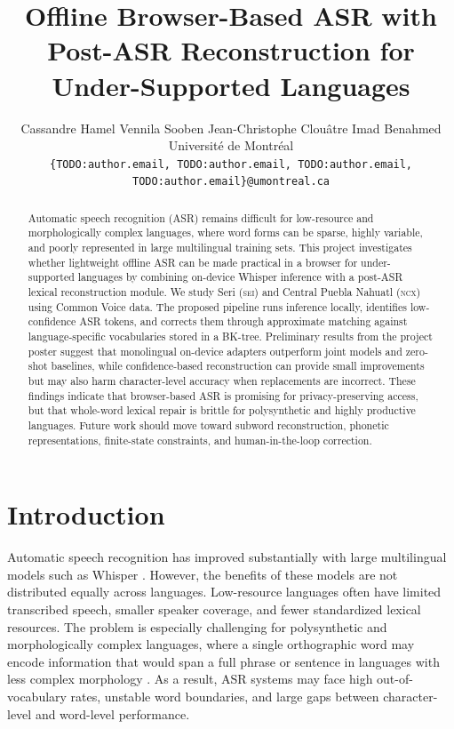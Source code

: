 \documentclass[11pt]{article}
\title{Offline Browser-Based ASR with Post-ASR Reconstruction for Under-Supported Languages}
\author{Cassandre Hamel \quad Vennila Sooben \quad Jean-Christophe Clou\^atre \quad Imad Benahmed\\
Universit\'e de Montr\'eal\\
\texttt{\{TODO:author.email, TODO:author.email, TODO:author.email, TODO:author.email\}@umontreal.ca}}
\makeatletter
\renewcommand{\maketitle}{%
    \twocolumn[
      \begin{center}
        {\Large\bfseries \@title\par}
        \vskip 0.6em
        {\large \@author\par}
        \vskip 1.0em
      \end{center}
    ]
  }
\newcommand{\sei}{\textsc{sei}}
\newcommand{\ncx}{\textsc{ncx}}
\makeatother
\begin{document}
\maketitle

\begin{abstract}
Automatic speech recognition (ASR) remains difficult for low-resource and morphologically complex languages, where word forms can be sparse, highly variable, and poorly represented in large multilingual training sets. This project investigates whether lightweight offline ASR can be made practical in a browser for under-supported languages by combining on-device Whisper inference with a post-ASR lexical reconstruction module. We study Seri (\sei) and Central Puebla Nahuatl (\ncx) using Common Voice data. The proposed pipeline runs inference locally, identifies low-confidence ASR tokens, and corrects them through approximate matching against language-specific vocabularies stored in a BK-tree. Preliminary results from the project poster suggest that monolingual on-device adapters outperform joint models and zero-shot baselines, while confidence-based reconstruction can provide small improvements but may also harm character-level accuracy when replacements are incorrect. These findings indicate that browser-based ASR is promising for privacy-preserving access, but that whole-word lexical repair is brittle for polysynthetic and highly productive languages. Future work should move toward subword reconstruction, phonetic representations, finite-state constraints, and human-in-the-loop correction.
\end{abstract}

\section{Introduction}

Automatic speech recognition has improved substantially with large multilingual models such as Whisper \citep{radford2023robust}. However, the benefits of these models are not distributed equally across languages. Low-resource languages often have limited transcribed speech, smaller speaker coverage, and fewer standardized lexical resources. The problem is especially challenging for polysynthetic and morphologically complex languages, where a single orthographic word may encode information that would span a full phrase or sentence in languages with less complex morphology \citep{gupta-boulianne-2020-automatic,leferrand-etal-2024-modern}. As a result, ASR systems may face high out-of-vocabulary rates, unstable word boundaries, and large gaps between character-level and word-level performance.
\end{document}
